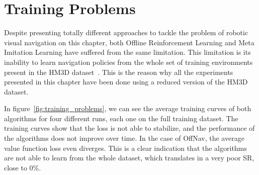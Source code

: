 \section{Training Problems}\label{sec:training-problems}

Despite presenting totally different approaches to tackle the problem of robotic visual navigation on this chapter, both Offline Reinforcement Learning and Meta Imitation Learning have suffered from the same limitation.
This limitation is its inability to learn navigation policies from the whole set of training environments present in the HM3D dataset~\cite{Ramakrishnan2021HabitatMatterport3D}.
This is the reason why all the experiments presented in this chapter have been done using a reduced version of the HM3D dataset.

In figure~\ref{fig:training_problems}, we can see the average training curves of both algorithms for four different runs, each one on the full training dataset.
The training curves show that the loss is not able to stabilize, and the performance of the algorithms does not improve over time.
In the case of OffNav, the average value function loss even diverges.
This is a clear indication that the algorithms are not able to learn from the whole dataset, which translates in a very poor SR, close to 0\%.

